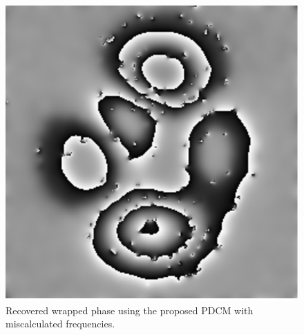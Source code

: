 \begin{figure}[Ht!] \label{fig:FaseErrorFrecuencias}
  \begin{center}
      \includegraphics[scale=0.6]{Chpt4_figures/fig_mFaseErrorFrecuencias.eps}
  \end{center}
  \caption{Recovered wrapped phase using the proposed PDCM with 
  miscalculated frequencies.}
\end{figure}

